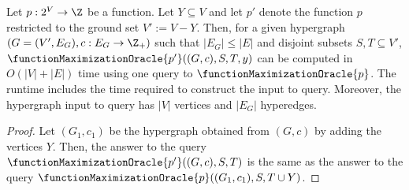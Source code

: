 \begin{claim}\label{claim:FunctionMaximizetionOracles:computing-maximal-tight-sets:maximization-oracle-for-restriction}
    Let $p:2^V\rightarrow\Z$ be a function. Let $Y \subseteq V$ and let $p'$ denote the function $p$ restricted to the ground set $V':=V - Y$. Then, for a given hypergraph $(G = (V', E_G), c:E_G\rightarrow\Z_+)$ such that $|E_G| \leq |E|$ and disjoint subsets $S, T \subseteq V'$, $\functionMaximizationOracle{p'}((G,c), S, T, y)$ can be computed in $O(|V| + |E|)$ time using one query to $\functionMaximizationOracle{p}$.
    The runtime includes the time required to construct the input to  query. Moreover, the hypergraph input to  query has $|V|$ vertices and $|E_G|$ hyperedges.
\end{claim}
\begin{proof}
    Let $(G_1, c_1)$ be the hypergraph obtained from $(G,c)$ by adding the vertices $Y$. Then, the answer to the query $\functionMaximizationOracle{p'}((G, c), S, T)$ is the same as the answer to the query $\functionMaximizationOracle{p}((G_1, c_1), S, T\cup Y)$.
\end{proof}





